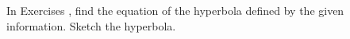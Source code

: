 {\noindent In Exercises}
{, find the equation of the hyperbola defined by the given information. Sketch the hyperbola.
}
